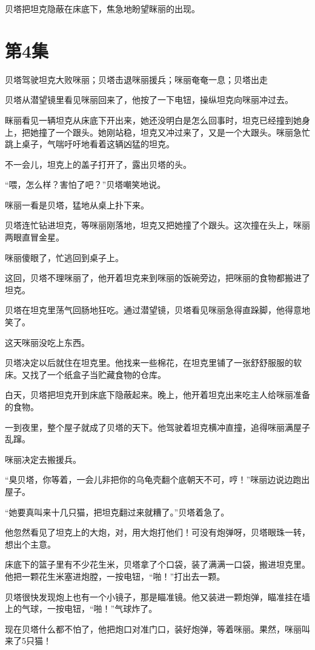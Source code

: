 \documentclass[a4paper,12pt,UTF8,twoside]{ctexbook}
\begin{document}
贝塔把坦克隐蔽在床底下，焦急地盼望眯丽的出现。

\chapter{第4集} 

贝塔驾驶坦克大败咪丽；贝塔击退咪丽援兵；咪丽奄奄一息；贝塔出走

贝塔从潜望镜里看见咪丽回来了，他按了一下电钮，操纵坦克向咪丽冲过去。

眯丽看见一辆坦克从床底下开出来，她还没明白是怎么回事时，坦克已经撞到她身上，把她撞了一个跟头。她刚站稳，坦克又冲过来了，又是一个大跟头。咪丽急忙跳上桌子，气喘吁吁地看着这辆凶猛的坦克。

不一会儿，坦克上的盖子打开了，露出贝塔的头。

“喂，怎么样？害怕了吧？”贝塔嘲笑地说。

咪丽一看是贝塔，猛地从桌上扑下来。

贝塔连忙钻进坦克，等咪丽刚落地，坦克又把她撞了个跟头。这次撞在头上，咪丽两眼直冒金星。

咪丽傻眼了，忙逃回到桌子上。

这回，贝塔不理咪丽了，他开着坦克来到咪丽的饭碗旁边，把咪丽的食物都搬进了坦克。

贝塔在坦克里荡气回肠地狂吃。通过潜望镜，贝塔看见咪丽急得直跺脚，他得意地笑了。

这天咪丽没吃上东西。

贝塔决定以后就住在坦克里。他找来一些棉花，在坦克里铺了一张舒舒服服的软床。又找了一个纸盒子当贮藏食物的仓库。

白天，贝塔把坦克开到床底下隐蔽起来。晚上，他开着坦克出来吃主人给咪丽准备的食物。

一到夜里，整个屋子就成了贝塔的天下。他驾驶着坦克横冲直撞，追得咪丽满屋子乱蹿。

咪丽决定去搬援兵。

“臭贝塔，你等着，一会儿非把你的乌龟壳翻个底朝天不可，哼！”咪丽边说边跑出屋子。

“她要真叫来十几只猫，把坦克翻过来就糟了。”贝塔着急了。

他忽然看见了坦克上的大炮，对，用大炮打他们！可没有炮弹呀，贝塔眼珠一转，想出个主意。

床底下的篮子里有不少花生米，贝塔拿了个口袋，装了满满一口袋，搬进坦克里。他把一颗花生米塞进炮膛，一按电钮，“啪！”打出去一颗。

贝塔很快发现炮上也有一个小镜子，那是瞄准镜。他又装进一颗炮弹，瞄准挂在墙上的气球，一按电钮，“啪！”气球炸了。

现在贝塔什么都不怕了，他把炮口对准门口，装好炮弹，等着咪丽。果然，咪丽叫来了5只猫！
\end{document}
